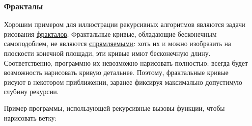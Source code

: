 \begin{Shaded}
\begin{Highlighting}[]
 
     \OperatorTok{<} \NormalTok{:}
         
    \NormalTok{:}
         \NormalTok{)}\OperatorTok{+}\NormalTok{)}

\NormalTok{))}
\end{Highlighting}
\end{Shaded}

\subsubsection{Фракталы}\label{ux444ux440ux430ux43aux442ux430ux43bux44b}

Хорошим примером для иллюстрации рекурсивных алгоритмов являются задачи
рисования
\href{https://wikipedia.org/ru/\%D0\%A4\%D1\%80\%D0\%B0\%D0\%BA\%D1\%82\%D0\%B0\%D0\%BB}{фракталов}.
Фрактальные кривые, обладающие бесконечным самоподобием, не являются
\href{https://wikipedia.org/ru/\%D0\%94\%D0\%BB\%D0\%B8\%D0\%BD\%D0\%B0_\%D0\%BA\%D1\%80\%D0\%B8\%D0\%B2\%D0\%BE\%D0\%B9}{спрямляемыми}:
хоть их и можно изобразить на плоскости конечной площади, эти кривые
имют бесконечную длину. Соответственно, программно их невозможно
нарисовать полностью: всегда будет возможность нарисовать кривую
детальнее. Поэтому, фрактальные кривые рисуют в некотором приближении,
заранее фиксируя максимально допустимую глубину рекурсии.

Пример программы, использующей рекурсивные вызовы функции, чтобы
нарисовать ветку:

